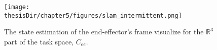 \begin{figure}
  \centering
  \captionsetup{justification=centering}
  \texttt{[image: \\thesisDir/chapter5/figures/slam\_intermittent.png]}
  \caption{The state estimation of the end-effector's frame visualize for the
  $\mathbb{R}^3$ part of the task space, $C_{ee}$.}
  \label{fig:slam_intermittent}
\end{figure}

